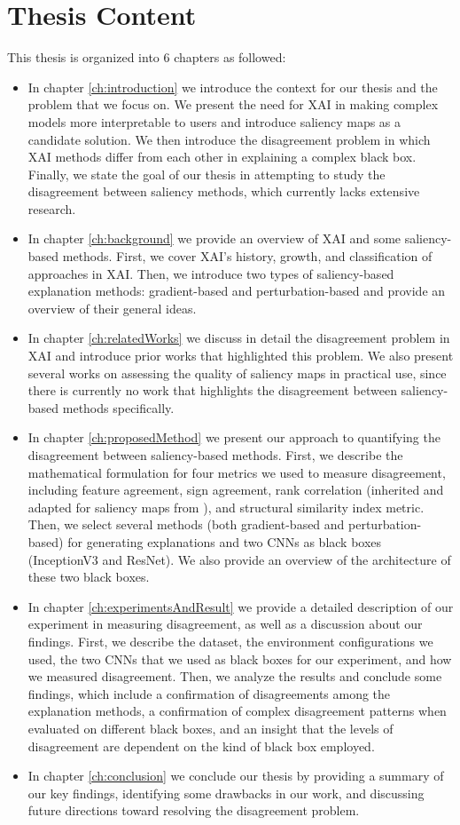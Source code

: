 \section{Thesis Content}
\label{sec:thesisContent}
This thesis is organized into 6 chapters as followed:
\begin{itemize}
    \item In chapter \ref{ch:introduction} we introduce the context for our thesis and the problem that we focus on. We present the need for XAI in making complex models more interpretable to users and introduce saliency maps as a candidate solution. We then introduce the disagreement problem in which XAI methods differ from each other in explaining a complex black box. Finally, we state the goal of our thesis in attempting to study the disagreement between saliency methods, which currently lacks extensive research.
    \item In chapter \ref{ch:background} we provide an overview of XAI and some saliency-based methods. First, we cover XAI's history, growth, and classification of approaches in XAI. Then, we introduce two types of saliency-based explanation methods: gradient-based and perturbation-based and provide an overview of their general ideas.
    \item In chapter \ref{ch:relatedWorks} we discuss in detail the disagreement problem in XAI and introduce prior works that highlighted this problem. We also present several works on assessing the quality of saliency maps in practical use, since there is currently no work that highlights the disagreement between saliency-based methods specifically.
    \item In chapter \ref{ch:proposedMethod} we present our approach to quantifying the disagreement between saliency-based methods. First, we describe the mathematical formulation for four metrics we used to measure disagreement, including feature agreement, sign agreement, rank correlation (inherited and adapted for saliency maps from \cite{krishna_disagreement_problem}), and structural similarity index metric. Then, we select several methods (both gradient-based and perturbation-based) for generating explanations and two CNNs as black boxes (InceptionV3 and ResNet). We also provide an overview of the architecture of these two black boxes.
    \item In chapter \ref{ch:experimentsAndResult} we provide a detailed description of our experiment in measuring disagreement, as well as a discussion about our findings. First, we describe the dataset, the environment configurations we used, the two CNNs that we used as black boxes for our experiment, and how we measured disagreement. Then, we analyze the results and conclude some findings, which include a confirmation of disagreements among the explanation methods, a confirmation of complex disagreement patterns when evaluated on different black boxes, and an insight that the levels of disagreement are dependent on the kind of black box employed.
    \item In chapter \ref{ch:conclusion} we conclude our thesis by providing a summary of our key findings, identifying some drawbacks in our work, and discussing future directions toward resolving the disagreement problem.
\end{itemize}